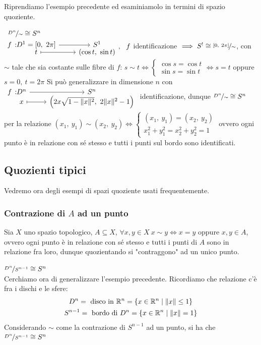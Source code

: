 Riprendiamo l'esempio precedente ed esaminiamolo in termini di spazio quoziente.
\begin{example}~{$\nicefrac{D^n}{\sim}\cong S^n$}\\
	$\funztot f {D^1=[0, \ 2\pi]} {S^1} t {(\cos t, \ \sin t)}, \ \ f$ 
	identificazione $\implies S^!\cong \nicefrac{[0, \ 2\pi]}{\sim}$, con $\sim$ tale che sia costante sulle fibre di $f$: $\displaystyle s\sim t \iff \begin{cases} 
		\cos s=\cos t \\
		\sin s =\sin t
	\end{cases} \iff s=t$ oppure $s=0,\ t=2\pi$ \newline
	Si può generalizzare in dimensione $n$ con $\funztot f {D^n} {S^n} x {\left( 2x\sqrt{1- \| x \|^2}, \ 2\| x\|^2 -1 \right)}$ identificazione, dunque $\nicefrac{D^n}{\sim}\cong S^n$ per la relazione $(x_1,\ y_1) \sim (x_2,\ y_2)\iff \begin{cases}
		(x_1,\ y_1)=(x_2,\ y_2)\\
		x_1^2 +y_1^2= x_2^2 +y_2^2=1
	\end{cases}$ ovvero ogni punto è in relazione con sé stesso e tutti i punti sul bordo sono identificati.
\end{example}
	
	\subsection{Quozienti tipici}
Vedremo ora degli esempi di spazi quoziente usati frequentemente.
\subsubsection{Contrazione di $A$ ad un punto}
Sia $X$ uno spazio topologico, $A\subseteq X$, $\forall x,y\in X \ x\sim y\iff x=y$ oppure $x,y\in A$, ovvero ogni punto è in relazione con sé stesso e tutti i punti di $A$ sono in relazione fra loro, dunque quozientando si "contraggono" ad un unico punto.
\begin{example} $\nicefrac{D^n}{S^{n-1}}\cong S^n$ \\
	Cerchiamo ora di generalizzare l'esempio precedente. Ricordiamo che relazione c'è fra i dischi e le sfere:
		\begin{gather*}
			D^n=\text{ disco in } \mathbb{R}^n=\{x\in\mathbb{R}^n \mid \| x \| \leq 1 \}\\
			S^{n-1}=\text{ bordo di } D^n=\{x\in\mathbb{R}^n \mid \| x \| = 1 \}
		\end{gather*}
	Considerando $\sim$ come la contrazione di $S^{n-1}$ ad un punto, si ha che $\nicefrac{D^n}{S^{n-1}} \cong S^n$	
\end{example}

